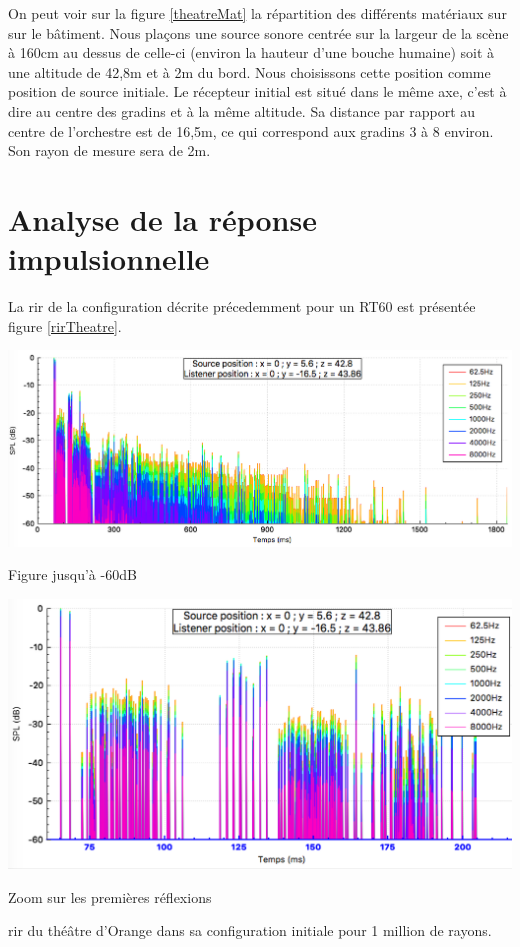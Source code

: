 On peut voir sur la figure \ref{theatreMat} la répartition des différents matériaux sur sur le bâtiment. Nous plaçons une source sonore centrée sur la largeur de la scène à 160cm au dessus de celle-ci (environ la hauteur d'une bouche humaine) soit à une altitude de 42,8m et à 2m du bord. Nous choisissons cette position comme position de source initiale. Le récepteur initial est situé dans le même axe, c'est à dire au centre des gradins et à la même altitude. Sa distance par rapport au centre de l'orchestre est de 16,5m, ce qui correspond aux gradins 3 à 8 environ. Son rayon de mesure sera de 2m. 


\section{Analyse de la réponse impulsionnelle}

La \gls{rir} de la configuration décrite précedemment pour un \gls{RT60} est présentée figure \ref{rirTheatre}.

\begin{figureth}
	\begin{subfigureth}{\linewidth}
		\includegraphics[width=\linewidth]{images/rirTheatre}
			\caption{Figure jusqu'à -60dB}
		\label{rirTheatre60}
	\end{subfigureth}
	\begin{subfigureth}{\linewidth}
		\includegraphics[width=\linewidth]{images/rirTheatrezoom}
		\caption{Zoom sur les premières réflexions}
		\label{rirTheatre30}
	\end{subfigureth}
	\caption{\gls{rir} du théâtre d'Orange dans sa configuration initiale pour 1 million de rayons.}
	\label{rirTheatre}
\end{figureth}

